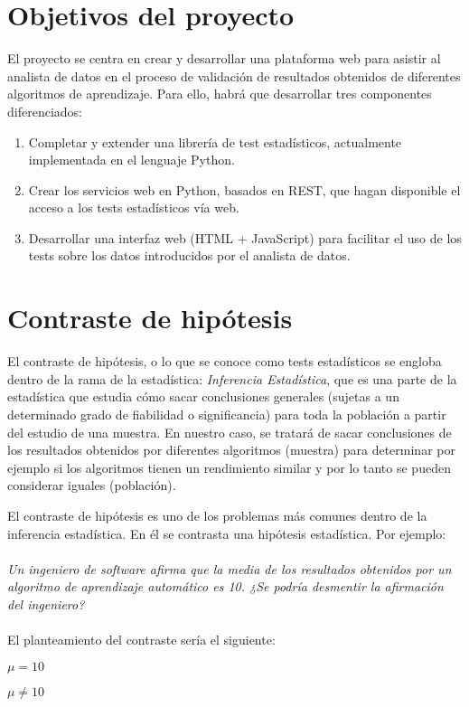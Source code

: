 \section{Objetivos del proyecto}
El proyecto se centra en crear y desarrollar una plataforma web para asistir al analista de datos
en el proceso de validación de resultados obtenidos de diferentes algoritmos de aprendizaje.
Para ello, habrá que desarrollar tres componentes diferenciados:
\begin{enumerate}
\item Completar y extender una librería de test estadísticos, actualmente implementada en el
lenguaje Python.
\item Crear los servicios web en Python, basados en REST, que hagan disponible el acceso a los
tests estadísticos vía web.
\item Desarrollar una interfaz web (HTML + JavaScript) para facilitar el uso de los tests sobre los
datos introducidos por el analista de datos.
\end{enumerate}

\section{Contraste de hipótesis}
El contraste de hipótesis, o lo que se conoce como tests estadísticos se engloba dentro de la rama de la
estadística: \textit{Inferencia Estadística}, que es una parte de la estadística que estudia cómo sacar
conclusiones generales (sujetas a un determinado grado de fiabilidad o significancia) para toda la población
a partir del estudio de una muestra. En nuestro caso, se tratará de sacar conclusiones de los resultados
obtenidos por diferentes algoritmos (muestra) para determinar por ejemplo si los algoritmos tienen un
rendimiento similar y por lo tanto se pueden considerar iguales (población).

El contraste de hipótesis es uno de los problemas más comunes dentro de la inferencia estadística. En él se
contrasta una hipótesis estadística. Por ejemplo:\\\\
\textit{Un ingeniero de software afirma que la media de los resultados obtenidos por un algoritmo
de aprendizaje automático es 10. ¿Se podría desmentir la afirmación del ingeniero?}\\\\
El planteamiento del contraste sería el siguiente:
\begin{center}
$ \mu = 10 $

$ \mu \neq 10 $
\end{center}

